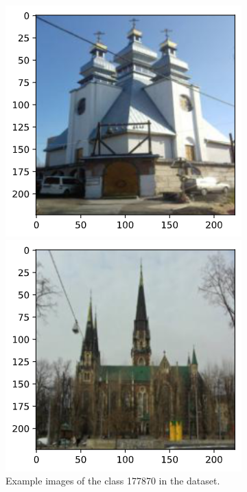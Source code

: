 \documentclass[10pt,twocolumn,letterpaper]{article}
\begin{document}
\begin{figure}[]
\begin{minipage}[t]{0.23\textwidth}
    \end{minipage}
    \begin{minipage}[t]{0.23\textwidth}
        \includegraphics[width=\textwidth]{COMP4471_Final_Report/img/177870_03.png}
    \end{minipage}
    \begin{minipage}[t]{0.23\textwidth}
        \includegraphics[width=\textwidth]{COMP4471_Final_Report/img/177870_04.png}
    \end{minipage}
    \caption{Example images of the class 177870 in the dataset.}
    \label{fig:class_177870}
\end{figure}
\end{document}
